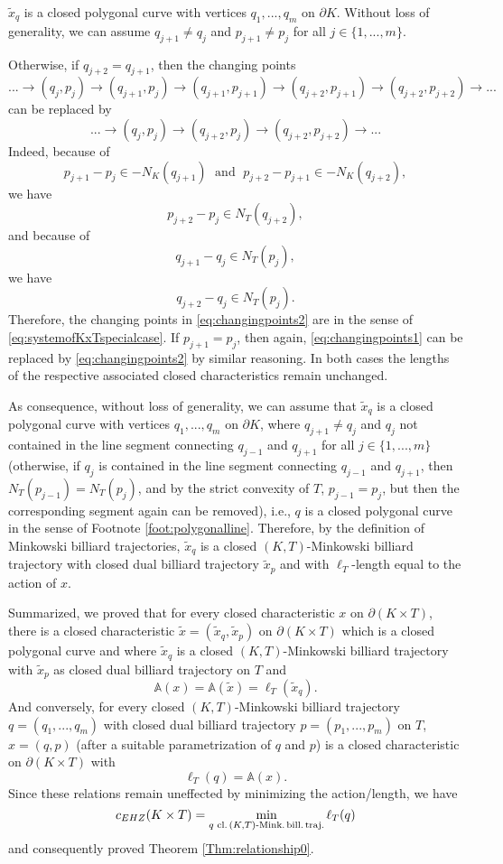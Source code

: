 \documentclass[12pt]{amsart}
\theoremstyle{plain}
\theoremstyle{remark}
\theoremstyle{definition}
\newcommand{\A}{\mathbb{A}}
\def\beq{\begin{equation}}\def\eeq{\end{equation}}
\def\beqq{\begin{equation*}}\def\eeqq{\end{equation*}}
\begin{document}
$\widetilde{x}_q$ is a closed polygonal curve with vertices $q_1,...,q_m$ on $\partial K$. Without loss of generality, we can assume $q_{j+1}\neq q_j$ and $p_{j+1}\neq p_j$ for all $j\in\{1,...,m\}$.

Otherwise, if $q_{j+2}=q_{j+1}$, then the changing points
\beq ...\rightarrow (q_j,p_j)\rightarrow (q_{j+1},p_j) \rightarrow (q_{j+1},p_{j+1})\rightarrow (q_{j+2},p_{j+1}) \rightarrow (q_{j+2},p_{j+2})\rightarrow ...\label{eq:changingpoints1}\eeq
can be replaced by
\beq ...\rightarrow (q_j,p_j) \rightarrow (q_{j+2},p_j)\rightarrow (q_{j+2},p_{j+2})\rightarrow ...\label{eq:changingpoints2}\eeq
Indeed, because of
\beqq p_{j+1}-p_{j}\in -N_K(q_{j+1}) \; \text{ and } \; p_{j+2}-p_{j+1}\in -N_K(q_{j+2}),\eeqq
we have
\beqq p_{j+2}-p_{j}\in N_T(q_{j+2}),\eeqq
and because of
\beqq q_{j+1}-q_j\in N_T(p_j),\eeqq
we have
\beqq q_{j+2}-q_j\in N_T(p_j).\eeqq
Therefore, the changing points in \eqref{eq:changingpoints2} are in the sense of \eqref{eq:systemofKxTspecialcase}. If $p_{j+1}=p_j$, then again, \eqref{eq:changingpoints1} can be replaced by \eqref{eq:changingpoints2} by similar reasoning. In both cases the lengths of the respective associated closed characteristics remain unchanged.

As consequence, without loss of generality, we can assume that $\widetilde{x}_q$ is a closed polygonal curve with vertices $q_1,...,q_m$ on $\partial K$, where $q_{j+1}\neq q_j$ and $q_j$ not contained in the line segment connecting $q_{j-1}$ and $q_{j+1}$ for all $j\in\{1,...,m\}$ (otherwise, if $q_j$ is contained in the line segment connecting $q_{j-1}$ and $q_{j+1}$, then $N_T(p_{j-1})=N_T(p_j)$, and by the strict convexity of $T$, $p_{j-1}=p_j$, but then the corresponding segment again can be removed), i.e., $q$ is a closed polygonal curve in the sense of Footnote \ref{foot:polygonalline}. Therefore, by the definition of Minkowski billiard trajectories, $\widetilde{x}_q$ is a closed $(K,T)$-Minkowski billiard trajectory with closed dual billiard trajectory $\widetilde{x}_p$ and with $\ell_T$-length equal to the action of $x$.

Summarized, we proved that for every closed characteristic $x$ on $\partial (K\times T)$, there is a closed characteristic $\widetilde{x}=(\widetilde{x}_q,\widetilde{x}_p)$ on $\partial (K\times T)$ which is a closed polygonal curve and where $\widetilde{x}_q$ is a closed $(K,T)$-Minkowski billiard trajectory with $\widetilde{x}_p$ as closed dual billiard trajectory on $T$ and
\beqq \A(x)=\A(\widetilde{x})=\ell_T(\widetilde{x}_q).\eeqq
And conversely, for every closed $(K,T)$-Minkowski billiard trajectory $q=(q_1,...,q_m)$ with closed dual billiard trajectory $p=(p_1,...,p_m)$ on $T$, $x=(q,p)$ (after a suitable parametrization of $q$ and $p$) is a closed characteristic on $\partial (K\times T)$ with
\beqq \ell_T(q)=\A(x).\eeqq
Since these relations remain uneffected by minimizing the action/length, we have
\beqq c_{EHZ}(K\times T) = \min_{q \text{ cl.\,}(K,T)\text{-Mink.\,bill.\,traj.}} \ell_T(q)\eeqq
and consequently proved Theorem \ref{Thm:relationship0}.
\end{document}
